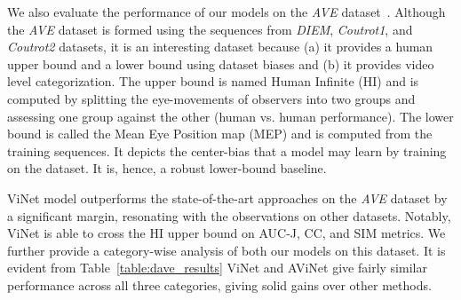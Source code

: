 \documentclass[letterpaper, 10 pt, conference]{ieeeconf}  \usepackage{times}
\begin{document}
We also evaluate the performance of our models on the \emph{AVE} dataset~\cite{tavakoli2019dave}. Although the \emph{AVE} dataset is formed using the sequences from \emph{DIEM}, \emph{Coutrot1}, and \emph{Coutrot2} datasets, it is an interesting dataset because (a) it provides a human upper bound and a lower bound using dataset biases and (b) it provides video level categorization. The upper bound is named Human Infinite (HI) and is computed by splitting the eye-movements of observers into two groups and assessing one group against the other (human vs. human performance). The lower bound is called the Mean Eye Position map (MEP) and is computed from the training sequences. It depicts the center-bias that a model may learn by training on the dataset. It is, hence, a robust lower-bound baseline.

ViNet model outperforms the state-of-the-art approaches on the \emph{AVE} dataset by a significant margin, resonating with the observations on other datasets. Notably, ViNet is able to cross the HI upper bound on AUC-J, CC, and SIM metrics. We further provide a category-wise analysis of both our models on this dataset. It is evident from Table~\ref{table:dave_results} ViNet and AViNet give fairly similar performance across all three categories, giving solid gains over other methods.  
\end{document}
